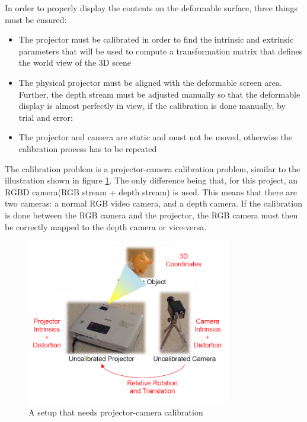 \documentclass[]{article}
\begin{document}
In order to properly display the contents on the deformable surface, three things must be ensured:
\begin{itemize}
\item The projector must be calibrated in order to find the intrinsic and extrinsic parameters that will be used to compute a transformation matrix that defines the world view of the 3D scene
\item The physical projector must be aligned with the deformable screen area. Further, the depth stream must be adjusted manually so that the deformable display is almost perfectly in view, if the calibration is done manually, by trial and error; 
\item The projector and camera are static and must not be moved, otherwise the calibration process has to be repeated\\
\end{itemize}

The calibration problem is a projector-camera calibration problem, similar to the illustration shown in figure \ref{fig:ProjectorCameraSetup}. The only difference being that, for this project, an RGBD camera(RGB stream + depth stream) is used. This means that there are two cameras: a normal RGB video camera, and a depth camera. If the calibration is done between the RGB camera and the projector, the RGB camera must then be correctly mapped to the depth camera or vice-versa.

\begin{figure}[hbtp]
    \centering
    \includegraphics[width=0.8\textwidth]{figures/Projector-Camera_Calibration.PNG}
    \caption{A setup that needs projector-camera calibration}
    \label{fig:ProjectorCameraSetup}
\end{figure}
\end{document}
